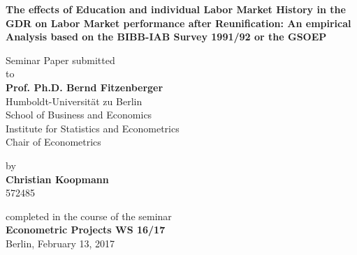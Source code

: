 \begin{center}

    {\Large{\bf The effects of Education and individual Labor Market History in the GDR on Labor
Market performance after Reunification: An empirical Analysis based on the BIBB-IAB
Survey 1991/92 or the GSOEP}} \vspace{0.5cm}


    {\normalsize Seminar Paper submitted\\\vspace{0.5cm}
    to}\\\vspace{0.5cm}
    {\normalsize{\bf Prof. Ph.D. Bernd Fitzenberger}} \\\vspace{0.5cm}
    {\normalsize Humboldt-Universit\"at zu Berlin \\
    School of Business and Economics \\
    Institute for Statistics and Econometrics \\
    Chair of Econometrics} \vspace{1cm}


    {\normalsize by \\\vspace{0.5cm}
    {\bf Christian Koopmann} \\
   572485} \vspace{1cm}


    {\normalsize completed in the course of the seminar \\
    {\bf Econometric Projects WS 16/17} \\
    Berlin, February 13, 2017}

\end{center}
